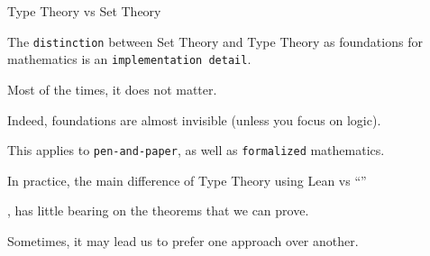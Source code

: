 \documentclass{beamer}
\begin{document}
\begin{frame}[fragile]{Type Theory vs Set Theory}

The {\color{violet}\verb`distinction`} between Set Theory and Type Theory as foundations for mathematics is an {\color{violet}\verb`implementation detail`}.

Most of the times, it does not matter.

Indeed, foundations are almost invisible (unless you focus on logic).

This applies to {\color{violet}\verb`pen-and-paper`}, as well as {\color{violet}\verb`formalized`} mathematics.
\end{frame}

\begin{frame}[fragile]

In practice, the main difference of Type Theory using Lean vs ``''

, has little bearing on the theorems that we can prove.

Sometimes, it may lead us to prefer one approach over another.
\end{frame}
\end{document}
